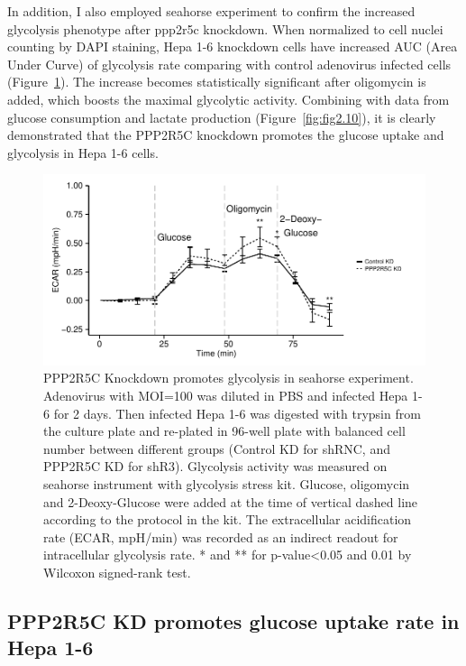 In addition, I also employed seahorse experiment to confirm the increased glycolysis phenotype after \gls{ppp2r5c} knockdown. When normalized to cell nuclei counting by DAPI staining, Hepa 1-6 knockdown cells have increased AUC (Area Under Curve) of glycolysis rate comparing with control adenovirus infected cells (Figure~\ref{fig:fig2.11}). The increase becomes statistically significant after oligomycin is added, which boosts the maximal glycolytic activity. Combining with data from glucose consumption and lactate production (Figure~\ref{fig:fig2.10}), it is clearly demonstrated that the PPP2R5C knockdown promotes the glucose uptake and glycolysis in Hepa 1-6 cells.

\begin{figure}[htbp]
\centering
\includegraphics[width=1\textwidth]{figs/fig2-11 seahorse.pdf}
\caption[PPP2R5C KD promotes glycolysis by seahorse measurement]{\footnotesize PPP2R5C Knockdown promotes glycolysis in seahorse experiment. Adenovirus with MOI=100 was diluted in PBS and infected Hepa 1-6 for 2 days. Then infected Hepa 1-6 was digested with trypsin from the culture plate and re-plated in 96-well plate with balanced cell number between different groups (Control KD for shRNC, and PPP2R5C KD for shR3). Glycolysis activity was measured on seahorse instrument with glycolysis stress kit. Glucose, oligomycin and 2-Deoxy-Glucose were added at the time of vertical dashed line according to the protocol in the kit. The extracellular acidification rate (ECAR, mpH/min) was recorded as an indirect readout for intracellular glycolysis rate. * and ** for p-value<0.05 and 0.01 by Wilcoxon signed-rank test.}
\label{fig:fig2.11}
\end{figure}

\subsection{PPP2R5C KD promotes glucose uptake rate in Hepa 1-6}

